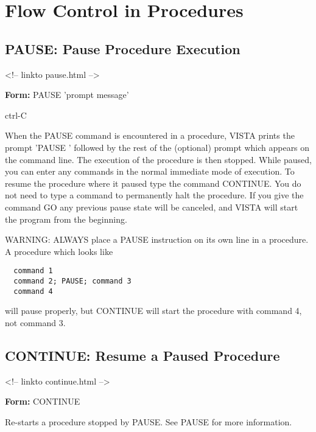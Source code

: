 \chapter{Flow Control in Procedures}


\section{PAUSE: Pause Procedure Execution}
\begin{rawhtml}
<!-- linkto pause.html -->
\end{rawhtml}

\begin{command}
\item[\textbf{Form: } PAUSE 'prompt message'\hfill]{}
\item[ctrl-C\hfill]{}
\end{command}

When the PAUSE command is encountered in a procedure, VISTA prints the
prompt 'PAUSE ' followed by the rest of the (optional) prompt which appears
on the command line.  The execution of the procedure is then stopped.
While paused, you can enter any commands in the normal immediate mode of
execution.  To resume the procedure where it paused type the command
CONTINUE.  You do not need to type a command to permanently halt the
procedure.  If you give the command GO any previous pause state will be
canceled, and VISTA will start the program from the beginning.

WARNING: ALWAYS place a PAUSE instruction on its own line in a procedure.
A procedure which looks like
\begin{verbatim}
  command 1
  command 2; PAUSE; command 3
  command 4
\end{verbatim}
will pause properly, but CONTINUE will start the procedure with 
command 4, not command 3.

\section{CONTINUE: Resume a Paused Procedure}
\begin{rawhtml}
<!-- linkto continue.html -->
\end{rawhtml}

\begin{command}
  \item[\textbf{Form: } CONTINUE\hfill]{}
\end{command}
Re-starts a procedure stopped by PAUSE. See PAUSE for more
information. 

